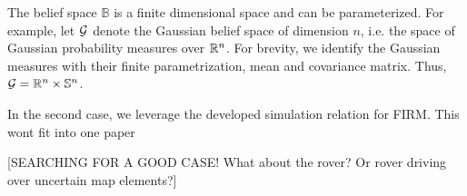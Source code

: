\documentclass{ifacconf}
\newcommand{\red}[1]{{\color{red} #1}}
\begin{document}
 \noindent{\textbf{}}
The belief space $\mathbb{B}$ is  a finite dimensional space and can be parameterized. For example, let $\mathcal{G}$ denote the Gaussian belief space
    of dimension $n$, i.e. the space of Gaussian
    probability measures over $\mathbb{R}^n$.
    For brevity, we identify the Gaussian measures
    with their finite parametrization, mean and
    covariance matrix.
     Thus,
    $\mathcal{G} =  \mathbb{R}^n \times  \mathbb S^n$.
    
    
 
 In the second case, we leverage the developed simulation relation for FIRM. \red{This wont fit into one paper}
 
 \red{[SEARCHING FOR A GOOD CASE! What about the rover? Or rover driving over uncertain map elements?]}





\end{document}
